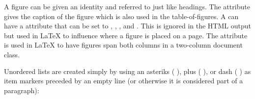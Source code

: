 \documentclass{book}
\begin{document}
\begin{mdP}[data-line={569}]%
{}A figure can be given an identity and referred to just like headings.
The %
{}%
{} attribute gives the caption of the figure which is also
used in the table-of-figures. A %
{}%
{} can have a %
{}%
{}
attribute that can be set to %
{}%
{}, %
{}%
{}, %
{}%
{}, %
{}%
{} and
{}%
{}. This is ignored in the HTML output but used in LaTeX to
influence where a figure is placed on a page. The %
{}%
{} attribute is
used in LaTeX to have figures span both columns in a two-column
document class.%
\end{mdP}%
\begin{mdP}[data-line={580}]%
{}Unordered lists are created simply by using an asteriks (%
{}\mdCode[class={code,code1}]{*}%
{}), plus (%
{}\mdCode[class={code,code1}]{+}%
{}),
or dash (%
{}\mdCode[class={code,code1}]{-}%
{}) as item markers preceded by an empty line (or otherwise
it is considered part of a paragraph):%
\end{mdP}%
\end{document}
